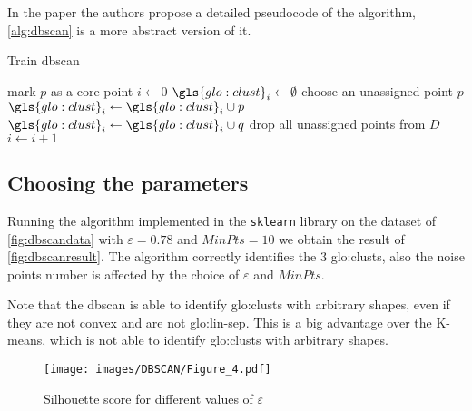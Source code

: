 In the paper \cite{dbscan} the authors propose a detailed pseudocode of the algorithm, \autoref{alg:dbscan} is a more abstract version of it.
\begin{algorithm}
    \caption{Train \gls{dbscan}}
  \label{alg:dbscan}
  \begin{algorithmic}[1]
            \State mark $p$ as a core point
        \EndIf
    \EndFor
    \State $i \gets 0$ 
        \State $\gls{glo:clust}_i \gets \emptyset $
        \State choose an unassigned point $p$
        \State $\gls{glo:clust}_i \gets \gls{glo:clust}_i \cup p $ 
            \State $\gls{glo:clust}_i \gets \gls{glo:clust}_i \cup q  $ 
        \EndFor
            \State drop all unassigned points from $D$ 
            \EndIf
        \State $i \gets i + 1$
    \EndWhile
    \EndProcedure
  \end{algorithmic}
\end{algorithm}

\subsection{Choosing the parameters}
Running the algorithm implemented in the \texttt{sklearn} library on the dataset of \autoref{fig:dbscandata} with $\varepsilon = 0.78$ and $MinPts = 10$ we obtain the result of \autoref{fig:dbscanresult}. The algorithm correctly identifies the $3$ \gls{glo:clust}s, also the noise points number is affected by the choice of $\varepsilon$ and $MinPts$.

Note that the \gls{dbscan} is able to identify \gls{glo:clust}s with arbitrary shapes, even if they are not convex and are not \gls{glo:lin-sep}. This is a big advantage over the K-means, which is not able to identify \gls{glo:clust}s with arbitrary shapes.


\begin{figure}
    \centering
    \texttt{[image: images/DBSCAN/Figure\_4.pdf]}
    \caption{Silhouette score for different values of $\varepsilon$}
    \label{fig:dbscansilhouette}
\end{figure}

